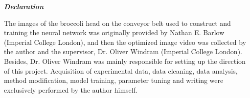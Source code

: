 \documentclass[12pt,a4paper]{article}
\begin{document}

\begin{center}
\mbox{}\newline\vspace{10mm} \mbox{}\LARGE
{\bf \textit{Declaration}} \normalsize \vspace{2mm}
\end{center}

\noindent
The images of the broccoli head on the conveyor belt used to construct and training the neural network was originally provided by Nathan E. Barlow (Imperial College London), and then the optimized image video was collected by the author and the supervisor, Dr. Oliver Windram (Imperial College London). Besides, Dr. Oliver Windram was mainly responsible for setting up the direction of this project. Acquisition of experimental data, data cleaning, data analysis, method modification, model training, parameter tuning and writing were exclusively performed by the author himself.

\newpage
\linenumbers 
 
\end{document}
